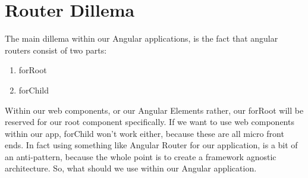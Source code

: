 \section{Router Dillema}
The main dillema within our Angular applications, is the fact that angular routers consist of two parts: 
\begin{enumerate}
  \item forRoot
  \item forChild
\end{enumerate}

Within our web components, or our Angular Elements rather, our forRoot will be reserved for our root component specifically. If we want to use web components within our app, forChild won't work either, because these are all micro front ends. In fact using something like Angular Router for our application, is a bit of an anti-pattern, because the whole point is to create a framework agnostic architecture. So, what should we use within our Angular application. 
